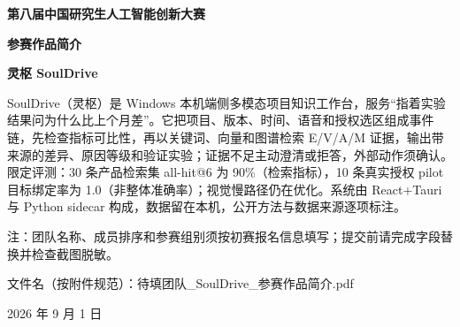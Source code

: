 \documentclass[UTF8,12pt]{ctexart}
\begin{document}
\pagestyle{empty}
\begin{titlepage}
  \centering
  \vspace*{1.55cm}
  {\bfseries 第八届中国研究生人工智能创新大赛\par}
  \vspace{1.15cm}
  {\bfseries 参赛作品简介\par}
  \vspace{0.95cm}
  {\bfseries 灵枢 SoulDrive\par}
  \vspace{1.5cm}
  \begin{keybox}[title={作品简介（正文约 277 字）}]
  \normalsize
  SoulDrive（灵枢）是 Windows 本机端侧多模态项目知识工作台，服务“指着实验结果问为什么比上个月差”。它把项目、版本、时间、语音和授权选区组成事件链，先检查指标可比性，再以关键词、向量和图谱检索 E/V/A/M 证据，输出带来源的差异、原因等级和验证实验；证据不足主动澄清或拒答，外部动作须确认。限定评测：30 条产品检索集 all-hit@6 为 90\%（检索指标），10 条真实授权 pilot 目标绑定率为 1.0（非整体准确率）；视觉慢路径仍在优化。系统由 React+Tauri 与 Python sidecar 构成，数据留在本机，公开方法与数据来源逐项标注。
  \end{keybox}
  \vfill
  \begin{flushleft}
    \small\color{sdmuted}
    注：团队名称、成员排序和参赛组别须按初赛报名信息填写；提交前请完成字段替换并检查截图脱敏。\par
    文件名（按附件规范）：待填团队\_SoulDrive\_参赛作品简介.pdf
  \end{flushleft}
  \vspace{0.35cm}
  {\small 2026 年 9 月 1 日\par}
\end{titlepage}
\end{document}
